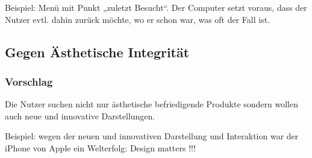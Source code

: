 Beispiel:  Menü mit Punkt „zuletzt Besucht“. Der Computer setzt voraus, dass der Nutzer evtl. dahin zurück möchte, wo er schon war, was oft der Fall ist.

\subsection{Gegen Ästhetische Integrität}
\subsubsection*{Vorschlag}
Die Nutzer suchen nicht nur ästhetische befriedigende Produkte sondern wollen auch neue und innovative Darstellungen.

Beispiel: wegen der neuen und innovativen Darstellung und Interaktion war der iPhone von Apple ein Welterfolg: Design matters !!!






















